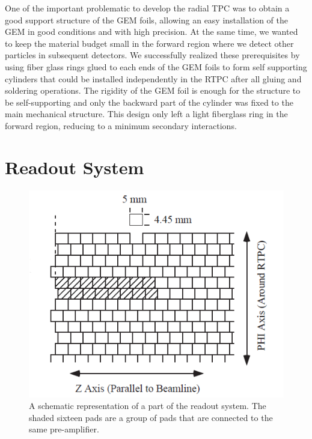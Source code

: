 \documentclass[twocolumn,showpacs,superscriptaddress,groupedaddress]{revtex4}
\begin{document}
One of the important problematic to develop the radial TPC was to obtain a 
good support structure of the GEM foils, allowing an easy installation of the 
GEM in good conditions and with high precision. At the same time, we wanted to 
keep the material budget small in the forward region where we detect other 
particles in subsequent detectors. We successfully realized these prerequisites 
by using fiber glass rings glued to each ends of the GEM foils to form self 
supporting cylinders that could be installed independently in the RTPC after 
all gluing and soldering operations. The rigidity of the GEM foil is enough
for the structure to be self-supporting and only the backward part of the 
cylinder was fixed to the main mechanical structure. This design only left a 
light fiberglass ring in the forward region, reducing to a minimum secondary 
interactions.

\section{Readout System} \label{sec_readout}

\begin{figure}[tb]
   \centering
   \includegraphics[scale=0.55]{fig/PADs.png}
   \caption[]{A schematic representation of a part of the readout system.  The 
   shaded sixteen pads are a group of pads that are connected to the same 
pre-amplifier.} \label{fig:PADs}
\end{figure}
\end{document}
